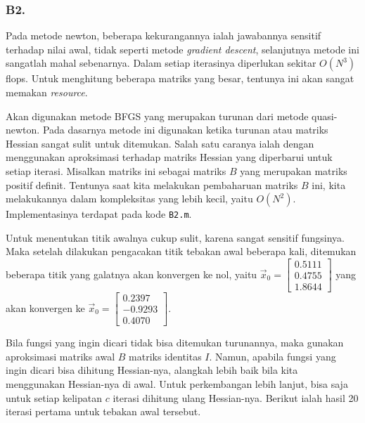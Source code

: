 \documentclass[11pt, a4paper, onecolumn, oneside, final]{report}
\begin{document}
\subsubsection*{B2.}

Pada metode newton, beberapa kekurangannya ialah jawabannya sensitif terhadap nilai awal, tidak seperti metode \textit{gradient descent}, selanjutnya metode ini sangatlah mahal sebenarnya. Dalam setiap iterasinya diperlukan sekitar $O(N^3)$ flops. Untuk menghitung beberapa matriks yang besar, tentunya ini akan sangat memakan \textit{resource}.

Akan digunakan metode BFGS yang merupakan turunan dari metode quasi-newton. Pada dasarnya metode ini digunakan ketika turunan atau matriks Hessian sangat sulit untuk ditemukan. Salah satu caranya ialah dengan menggunakan aproksimasi terhadap matriks Hessian yang diperbarui untuk setiap iterasi.  Misalkan matriks ini sebagai matriks $B$ yang merupakan matriks positif definit. Tentunya saat kita melakukan pembaharuan matriks $B$ ini, kita melakukannya dalam kompleksitas yang lebih kecil, yaitu $O(N^2)$. Implementasinya terdapat pada kode \texttt{B2.m}.

Untuk menentukan titik awalnya cukup sulit, karena sangat sensitif fungsinya. Maka setelah dilakukan pengacakan titik tebakan awal beberapa kali, ditemukan beberapa titik yang galatnya akan konvergen ke nol, yaitu $\vec{x}_0 = \begin{bmatrix} 0.5111 \\
  0.4755\\
  1.8644\end{bmatrix}$ yang akan konvergen ke $\vec{x}_0 = \begin{bmatrix} 0.2397 \\
  -0.9293\\
   0.4070\end{bmatrix}$.

Bila fungsi yang ingin dicari tidak bisa ditemukan turunannya, maka gunakan aproksimasi matriks awal $B$ matriks identitas $\textit{I}$. Namun, apabila fungsi yang ingin dicari bisa dihitung Hessian-nya, alangkah lebih baik bila kita menggunakan Hessian-nya di awal. Untuk perkembangan lebih lanjut, bisa saja untuk setiap kelipatan $c$ iterasi dihitung ulang Hessian-nya. Berikut ialah hasil 20 iterasi pertama untuk tebakan awal tersebut.
\end{document}
